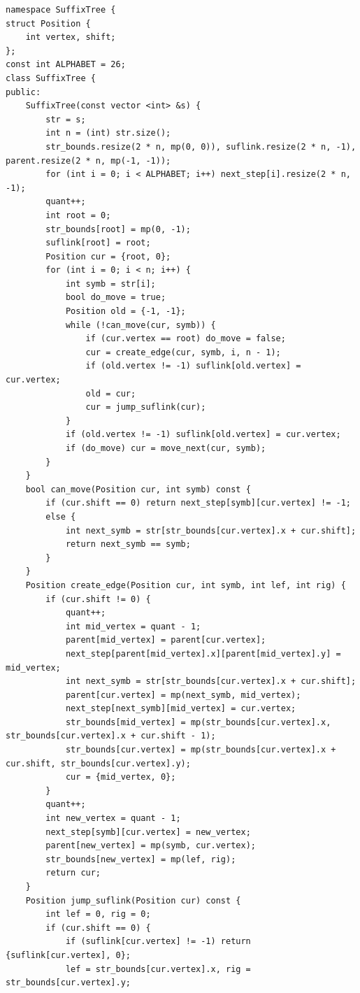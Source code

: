\documentclass[10pt, portrait,letterpaper]{article}
\begin{document}
\begin{verbatim}
namespace SuffixTree {
struct Position {
    int vertex, shift; 	
};
const int ALPHABET = 26;
class SuffixTree {
public: 	 	
    SuffixTree(const vector <int> &s) {
        str = s;
        int n = (int) str.size();
        str_bounds.resize(2 * n, mp(0, 0)), suflink.resize(2 * n, -1), parent.resize(2 * n, mp(-1, -1));
        for (int i = 0; i < ALPHABET; i++) next_step[i].resize(2 * n, -1);
        quant++;
        int root = 0;
        str_bounds[root] = mp(0, -1);
        suflink[root] = root;
        Position cur = {root, 0};
        for (int i = 0; i < n; i++) {
            int symb = str[i];
            bool do_move = true;
            Position old = {-1, -1};
            while (!can_move(cur, symb)) {
                if (cur.vertex == root) do_move = false;
                cur = create_edge(cur, symb, i, n - 1);
                if (old.vertex != -1) suflink[old.vertex] = cur.vertex;
                old = cur;
                cur = jump_suflink(cur);
            }
            if (old.vertex != -1) suflink[old.vertex] = cur.vertex;
            if (do_move) cur = move_next(cur, symb);
        }
    }
    bool can_move(Position cur, int symb) const {
        if (cur.shift == 0) return next_step[symb][cur.vertex] != -1;
        else {
            int next_symb = str[str_bounds[cur.vertex].x + cur.shift];
            return next_symb == symb;
        }
    }
    Position create_edge(Position cur, int symb, int lef, int rig) {
        if (cur.shift != 0) {
            quant++;
            int mid_vertex = quant - 1;
            parent[mid_vertex] = parent[cur.vertex];
            next_step[parent[mid_vertex].x][parent[mid_vertex].y] = mid_vertex;
            int next_symb = str[str_bounds[cur.vertex].x + cur.shift];
            parent[cur.vertex] = mp(next_symb, mid_vertex);
            next_step[next_symb][mid_vertex] = cur.vertex;
            str_bounds[mid_vertex] = mp(str_bounds[cur.vertex].x, str_bounds[cur.vertex].x + cur.shift - 1);
            str_bounds[cur.vertex] = mp(str_bounds[cur.vertex].x + cur.shift, str_bounds[cur.vertex].y);
            cur = {mid_vertex, 0};
        }   
        quant++;
        int new_vertex = quant - 1;
        next_step[symb][cur.vertex] = new_vertex;
        parent[new_vertex] = mp(symb, cur.vertex);
        str_bounds[new_vertex] = mp(lef, rig);
        return cur;
    }
    Position jump_suflink(Position cur) const {
        int lef = 0, rig = 0;
        if (cur.shift == 0) {
            if (suflink[cur.vertex] != -1) return {suflink[cur.vertex], 0};
            lef = str_bounds[cur.vertex].x, rig = str_bounds[cur.vertex].y;

\end{verbatim}
\end{document}
